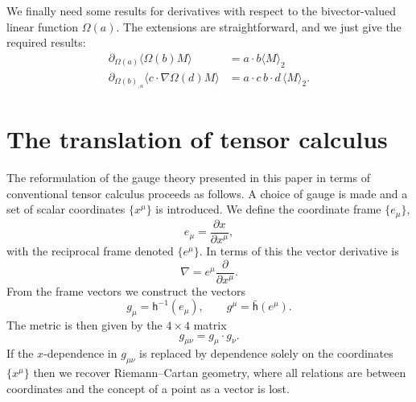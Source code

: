 \documentclass[a4paper]{article}
\numberwithin{equation}{section}
\newcommand{\dt}{\! \cdot \!}
\newcommand{\la}{\langle}
\newcommand{\ra}{\rangle}
\newcommand{\eqv}{=}
\newcommand{\Om}{\Omega}
\newcommand{\lih}{\mathsf{h}}
\newcommand{\lbh}{\bar{\mathsf{h}}}
\newcommand{\ho}{\lbh}
\newcommand{\hu}{\lih}
\newcommand{\grad}{\nabla}
\newcommand{\deriv}[2]{\frac{\partial #1}{\partial #2}}
\begin{document}
We finally need some results for derivatives with respect to the
bivector-valued linear function $\Om(a)$.  The extensions are
straightforward, and we just give the required results:
%
\begin{align}
\partial_{\Omega(a)} \la \Omega(b)M \ra &= a \dt b \la M \ra_2 \\
\partial_{\Omega(b)_{,a}} \la c \dt \grad \Omega(d) M \ra 
&=  a \dt c \, b \dt d \, \la M \ra_2.
\end{align}
%



\section{The translation of tensor calculus}
\label{app-tens}

The reformulation of the gauge theory presented in this paper in terms
of conventional tensor calculus proceeds as follows.  A choice of
gauge is made and a set of scalar coordinates $\{x^\mu\}$ is
introduced.  We define the coordinate frame $\{e_\mu\}$,
%
\begin{equation}
e_\mu \eqv \deriv{x}{x^\mu},
\end{equation}
%
with the reciprocal frame denoted $\{e^\mu\}$.  In terms of this the
vector derivative is 
%
\begin{equation}
 \grad = e^\mu \deriv{}{x^\mu}.
\end{equation}
%
From the frame vectors we construct the vectors
%
\begin{equation}
g_\mu \eqv \hu^{-1}(e_\mu), \qquad
g^\mu \eqv \ho(e^\mu).
\end{equation}
%
The metric is then given by the $4\times 4$ matrix
%
\begin{equation}
g_{\mu \nu} \eqv g_\mu \dt g_\nu.
\end{equation}
%
If the $x$-dependence in $g_{\mu \nu}$ is replaced by dependence
solely on the coordinates $\{x^\mu\}$ then we recover Riemann--Cartan
geometry, where all relations are between coordinates and the concept
of a point as a vector is lost.
\end{document}
